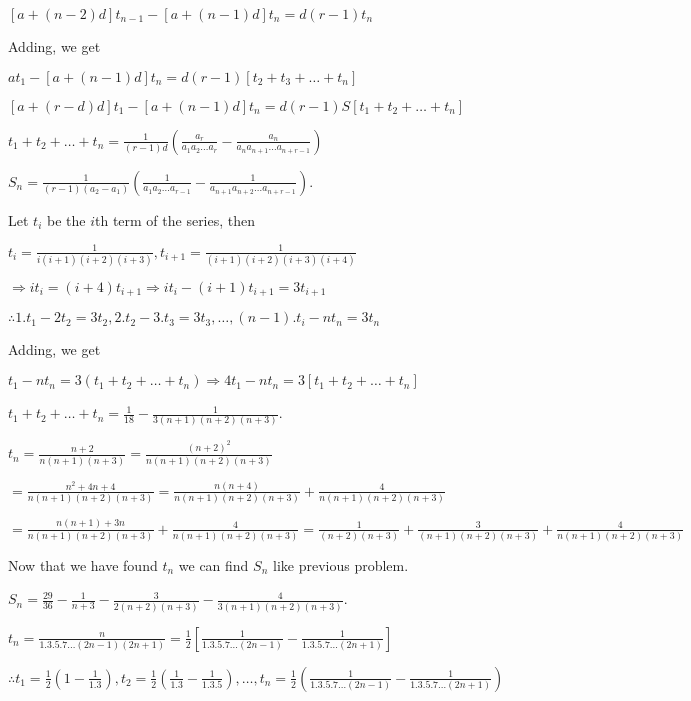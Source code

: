   $[a + (n - 2)d]t_{n - 1} - [a + (n - 1)d]t_n = d(r - 1)t_n$

  Adding, we get

  $at_1 - [a + (n - 1)d]t_n = d(r - 1)[t_2 + t_3 + \ldots + t_n]$

  $[a + (r - d)d]t_1 - [a + (n - 1)d]t_n = d(r - 1)S[t_1 + t_2 + \ldots + t_n]$

  $t_1 + t_2 + \ldots + t_n = \frac{1}{(r - 1)d}\left(\frac{a_r}{a_1a_2\ldots a_r} - \frac{a_n}{a_na_{n + 1}\ldots a_{n + r -
      1}}\right)$

  $S_n = \frac{1}{(r - 1)(a_2 - a_1)}\left(\frac{1}{a_1a_2\ldots a_{r - 1}} - \frac{1}{a_{n + 1}a_{n + 2}\ldots a_{n + r -
      1}}\right)$.
\item Let $t_i$ be the $i$th term of the series, then

  $t_i = \frac{1}{i(i + 1)(i + 2)(i + 3)}, t_{i+1} = \frac{1}{(i + 1)(i + 2)(i + 3)(i + 4)}$

  $\Rightarrow it_i = (i + 4)t_{i + 1}\Rightarrow it_i - (i + 1)t_{i + 1} = 3t_{i+1}$

  $\therefore 1.t_1 - 2t_2 = 3t_2, 2.t_2 - 3.t_3 = 3t_3, \ldots,(n - 1).t_i - nt_n = 3t_n$

  Adding, we get

  $t_1 - nt_n = 3(t_1 + t_2 + \ldots + t_n)\Rightarrow 4t_1 - nt_n = 3[t_1 + t_2 + \ldots + t_n]$

  $t_1 + t_2 + \ldots + t_n = \frac{1}{18} - \frac{1}{3(n + 1)(n + 2)(n + 3)}$.
\item $t_n = \frac{n + 2}{n(n + 1)(n + 3)} = \frac{(n + 2)^2}{n(n + 1)(n + 2)(n + 3)}$

  $= \frac{n^2 + 4n + 4}{n(n + 1)(n + 2)(n + 3)} = \frac{n(n + 4)}{n(n + 1)(n + 2)(n + 3)} + \frac{4}{n(n +
  1)(n + 2)(n + 3)}$

  $= \frac{n(n + 1) + 3n}{n(n + 1)(n + 2)(n + 3)} + \frac{4}{n(n + 1)(n + 2)(n + 3)} = \frac{1}{(n + 2)(n +
  3)} + \frac{3}{(n + 1)(n + 2)(n + 3)} + \frac{4}{n(n + 1)(n + 2)(n + 3)}$

  Now that we have found $t_n$ we can find $S_n$ like previous problem.

  $S_n = \frac{29}{36} - \frac{1}{n + 3} - \frac{3}{2(n + 2)(n + 3)} - \frac{4}{3(n + 1)(n + 2)(n + 3)}$.
\item $t_n = \frac{n}{1.3.5.7\ldots (2n - 1)(2n + 1)} = \frac{1}{2}\left[\frac{1}{1.3.5.7\ldots(2n - 1)} -
  \frac{1}{1.3.5.7\ldots(2n + 1)}\right]$

  $\therefore t_1 = \frac{1}{2}\left(1 - \frac{1}{1.3}\right),t_2 = \frac{1}{2}\left(\frac{1}{1.3} -
  \frac{1}{1.3.5}\right),\ldots,t_n = \frac{1}{2}\left(\frac{1}{1.3.5.7\ldots(2n - 1)} -
  \frac{1}{1.3.5.7\ldots(2n + 1)}\right)$

